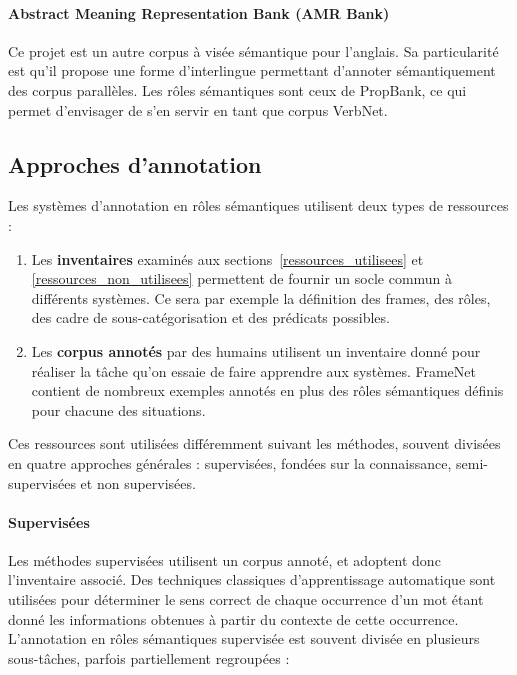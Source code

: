 \paragraph{Abstract Meaning Representation Bank (AMR Bank)}

Ce projet \citep{banarescu2013abstract} est un autre corpus à visée sémantique
pour l'anglais. Sa particularité est qu'il propose une forme d'interlingue
permettant d'annoter sémantiquement des corpus parallèles. Les rôles
sémantiques sont ceux de PropBank, ce qui permet d'envisager de s'en servir en
tant que corpus VerbNet.

\subsection{Approches d'annotation}

Les systèmes d'annotation en rôles sémantiques utilisent deux types de
ressources :

\begin{enumerate}
    \item Les \textbf{inventaires} examinés aux
        sections~\ref{ressources_utilisees} et \ref{ressources_non_utilisees}
        permettent de fournir un socle commun à différents systèmes. Ce sera
        par exemple la définition des frames, des rôles, des cadre de
        sous-catégorisation et des prédicats possibles.
    \item Les \textbf{corpus annotés} par des humains utilisent un inventaire
        donné pour réaliser la tâche qu'on essaie de faire apprendre aux
        systèmes. FrameNet contient de nombreux exemples annotés en plus des
        rôles sémantiques définis pour chacune des situations.
\end{enumerate}

Ces ressources sont utilisées différemment suivant les méthodes, souvent
divisées en quatre approches générales : supervisées, fondées sur la
connaissance, semi-supervisées et non supervisées.

\paragraph{Supervisées}

Les méthodes supervisées
\citep{gildea2002automatic,surdeanu2008conll,das2014frame,hermann2014semantic,lluis2014shortest}
utilisent un corpus annoté, et adoptent donc l'inventaire associé. Des
techniques classiques d'apprentissage automatique sont utilisées pour
déterminer le sens correct de chaque occurrence d'un mot étant donné les
informations obtenues à partir du contexte de cette occurrence.  L'annotation
en rôles sémantiques supervisée est souvent divisée en plusieurs sous-tâches,
parfois partiellement regroupées :

